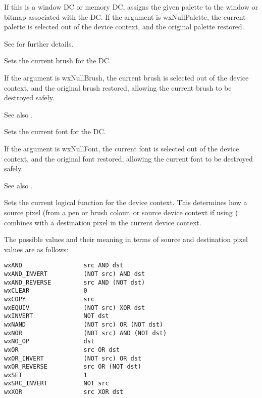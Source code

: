 If this is a window DC or memory DC, assigns the given palette to the window
or bitmap associated with the DC. If the argument is wxNullPalette, the current
palette is selected out of the device context, and the original palette
restored.

See  for further details.

\label{wxdcsetbrush}


Sets the current brush for the DC.

If the argument is wxNullBrush, the current brush is selected out of the device
context, and the original brush restored, allowing the current brush to
be destroyed safely.

See also .

\label{wxdcsetfont}


Sets the current font for the DC.

If the argument is wxNullFont, the current font is selected out of the device
context, and the original font restored, allowing the current font to
be destroyed safely.

See also .

\label{wxdcsetlogicalfunction}


Sets the current logical function for the device context.  This determines how
a source pixel (from a pen or brush colour, or source device context if
using ) combines with a destination pixel in the
current device context.

The possible values
and their meaning in terms of source and destination pixel values are
as follows:

\begin{verbatim}
wxAND                 src AND dst
wxAND_INVERT          (NOT src) AND dst
wxAND_REVERSE         src AND (NOT dst)
wxCLEAR               0
wxCOPY                src
wxEQUIV               (NOT src) XOR dst
wxINVERT              NOT dst
wxNAND                (NOT src) OR (NOT dst)
wxNOR                 (NOT src) AND (NOT dst)
wxNO_OP               dst
wxOR                  src OR dst
wxOR_INVERT           (NOT src) OR dst
wxOR_REVERSE          src OR (NOT dst)
wxSET                 1
wxSRC_INVERT          NOT src
wxXOR                 src XOR dst
\end{verbatim}

